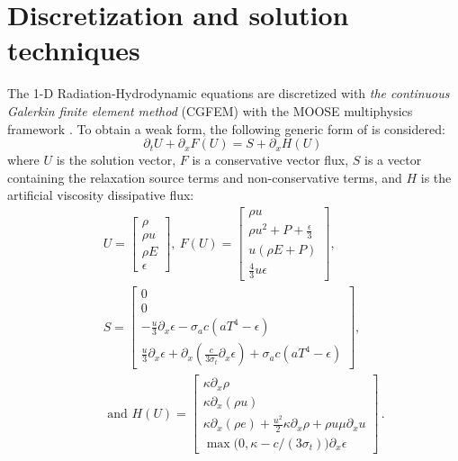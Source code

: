 \documentclass[times,doublespace]{fldauth}%
\begin{document}
\section{Discretization and solution techniques}\label{sec:discr}
%
The 1-D Radiation-Hydrodynamic equations  are discretized with \emph{the continuous Galerkin finite element method} (CGFEM) with the MOOSE multiphysics framework \cite{Moose}. To obtain a weak form, the following generic form of  is considered:
\begin{equation}
\label{eq:form}
\partial_t U + \partial_x F \left( U \right) = S + \partial_x H \left(U\right) \,
\end{equation}
where $U$ is the solution vector, $F$ is a conservative vector flux, $S$ is a vector containing the relaxation source terms and non-conservative terms, and $H$ is the artificial viscosity dissipative flux:
\begin{eqnarray*}
&&U = 
\begin{bmatrix}
\rho \\
\rho u \\
\rho E \\
\epsilon
\end{bmatrix}
,\
F(U) = 
\begin{bmatrix}
\rho u \\
\rho u^2 + P + \frac{\epsilon}{3} \\
u \left( \rho E + P \right) \\
\frac{4}{3} u \epsilon
\end{bmatrix}
,\ \\
&&S = 
\begin{bmatrix}
0 \\
0 \\
-\frac{u}{3} \partial_x \epsilon - \sigma_a c \left( a T^4 - \epsilon \right) \\
\frac{u}{3} \partial_x \epsilon + \partial_x \left( \frac{c}{3 \sigma_t} \partial_x \epsilon \right) + \sigma_a c \left( a T^4 - \epsilon \right)
\end{bmatrix}
,
\\
&&\text{ and } 
H(U) = 
\begin{bmatrix}
\kappa \partial_x \rho \\
\kappa \partial_x (\rho u) \\
\kappa \partial_x \left( \rho e \right) + \frac{u^2}{2} \kappa \partial_x \rho + \rho u \mu \partial_x u \\
\max \big( 0, \kappa- c/(3 \sigma_t) \big) \partial_x \epsilon 
\end{bmatrix} \,.
\end{eqnarray*}
\end{document}
